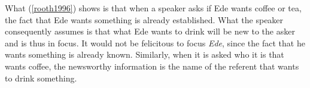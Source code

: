 \begin{exe}
\ex\label{rooth1996} 
{}
\end{exe}

\noindent What (\ref{rooth1996}) shows is that when a speaker asks if Ede wants coffee or tea, the fact that Ede wants something is already established. What the speaker consequently assumes is that what Ede wants to drink will be new to the asker and is thus in focus. It would not be felicitous to focus \textit{Ede}, since the fact that he wants something is already known. Similarly, when it is asked who it is that wants coffee, the newsworthy information is the name of the referent that wants to drink something. 

